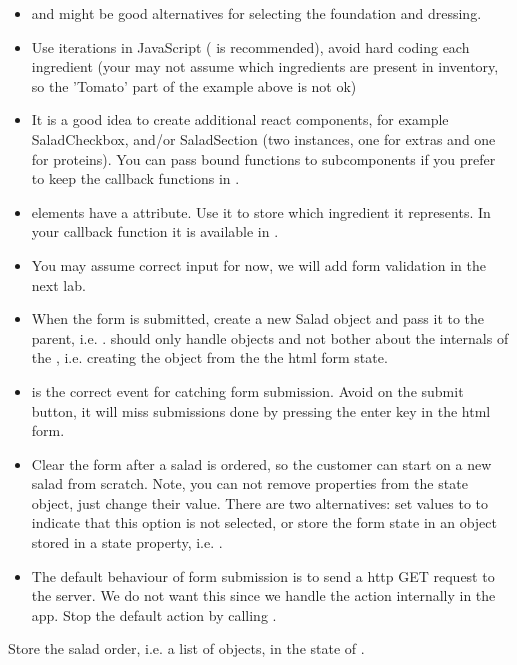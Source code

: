 \documentclass[fleqn, article, a4paper]{memoir}
\begin{document}
\begin{Assignments}
\begin{itemize}
  \item {} and  might be good alternatives for selecting the foundation and dressing.
  \item Use iterations in JavaScript ( is recommended), avoid hard coding each ingredient (your may not assume which ingredients are present in inventory, so the 'Tomato' part of the example above is not ok)
  \item It is a good idea to create additional react components, for example SaladCheckbox, and/or SaladSection (two instances, one for extras and one for proteins). You can pass bound functions to subcomponents if you prefer to keep the callback functions in .
  \item {} elements have a  attribute. Use it to store which ingredient it represents. In your callback function it is available in .
  \item You may assume correct input for now, we will add form validation in the next lab.
  \item When the form is submitted, create a new Salad object and pass it to the parent, i.e. .  should only handle  objects and not bother about the internals of the , i.e. creating the object from the the html form state.
  \item {} is the correct event for catching form submission. Avoid  on the submit button, it will miss submissions done by pressing the enter key in the html form.
  \item Clear the form after a salad is ordered, so the customer can start on a new salad from scratch. Note, you can not remove properties from the state object, just change their value. There are two alternatives: set values to  to indicate that this option is not selected, or store the form state in an object stored in a state property, i.e. .
  \item The default behaviour of form submission is to send a http GET request to the server. We do not want this since we handle the action internally in the app. Stop the default action by calling .
\end{itemize}

\item Store the salad order, i.e. a list of  objects, in the state of .


\end{Assignments}
\end{document}
